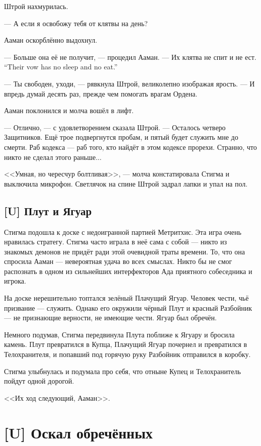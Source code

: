 Штрой нахмурилась.

--- А если я освобожу тебя от клятвы на день?

Ааман оскорблённо выдохнул.

--- Больше она её не получит, --- процедил Ааман.
{--- Их клятва не спит и не ест.}
{``Their vow has no sleep and no eat.''}

--- Ты свободен, уходи, --- рявкнула Штрой, великолепно изображая ярость.
--- И впредь думай десять раз, прежде чем помогать врагам Ордена.

Ааман поклонился и молча вошёл в лифт.

--- Отлично, --- с удовлетворением сказала Штрой.
--- Осталось четверо Защитников.
Ещё трое подвергнутся пробам, и пятый будет служить мне до смерти.
Раб кодекса --- раб того, кто найдёт в этом кодексе прорехи.
Странно, что никто не сделал этого раньше...

<<Умная, но чересчур болтливая>>, --- молча констатировала Стигма и выключила микрофон.
Светлячок на спине Штрой задрал лапки и упал на пол.

\section{[U] Плут и Ягуар}

Стигма подошла к доске с недоигранной партией Метритхис.
Эта игра очень нравилась стратегу.
Стигма часто играла в неё сама с собой --- никто из знакомых демонов не придёт ради этой очевидной траты времени.
То, что она спросила Ааман --- невероятная удача во всех смыслах.
Никто бы не смог распознать в одном из сильнейших интерфекторов Ада приятного собеседника и игрока.

На доске нерешительно топтался зелёный Плачущий Ягуар.
Человек чести, чьё призвание --- служить.
Однако его окружили чёрный Плут и красный Разбойник --- не признающие верности, не имеющие чести.
Ягуар был обречён.

Немного подумав, Стигма передвинула Плута поближе к Ягуару и бросила камень.
Плут превратился в Купца, Плачущий Ягуар почернел и превратился в Телохранителя, и попавший под горячую руку Разбойник отправился в коробку.

Стигма улыбнулась и подумала про себя, что отныне Купец и Телохранитель пойдут одной дорогой.

<<Их ход следующий, Ааман>>.

\chapter{[U] Оскал обречённых}

